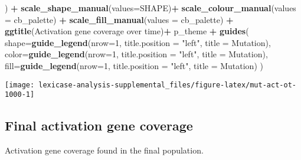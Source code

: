 \documentclass[
]{book}
\newenvironment{Shaded}{\begin{snugshade}}{\end{snugshade}}
\newcommand{\AttributeTok}[1]{\textcolor[rgb]{0.13,0.29,0.53}{#1}}
\newcommand{\DecValTok}[1]{\textcolor[rgb]{0.00,0.00,0.81}{#1}}
\newcommand{\FunctionTok}[1]{\textcolor[rgb]{0.13,0.29,0.53}{\textbf{#1}}}
\newcommand{\NormalTok}[1]{#1}
\newcommand{\SpecialCharTok}[1]{\textcolor[rgb]{0.81,0.36,0.00}{\textbf{#1}}}
\newcommand{\StringTok}[1]{\textcolor[rgb]{0.31,0.60,0.02}{#1}}
\begin{document}
\begin{Shaded}
\begin{Highlighting}[]
\NormalTok{  ) }\SpecialCharTok{+}
  \FunctionTok{scale\_shape\_manual}\NormalTok{(}\AttributeTok{values=}\NormalTok{SHAPE)}\SpecialCharTok{+}
  \FunctionTok{scale\_colour\_manual}\NormalTok{(}\AttributeTok{values =}\NormalTok{ cb\_palette) }\SpecialCharTok{+}
  \FunctionTok{scale\_fill\_manual}\NormalTok{(}\AttributeTok{values =}\NormalTok{ cb\_palette) }\SpecialCharTok{+}
  \FunctionTok{ggtitle}\NormalTok{(}\StringTok{\textquotesingle{}Activation gene coverage over time\textquotesingle{}}\NormalTok{)}\SpecialCharTok{+}
\NormalTok{  p\_theme }\SpecialCharTok{+}
  \FunctionTok{guides}\NormalTok{(}
    \AttributeTok{shape=}\FunctionTok{guide\_legend}\NormalTok{(}\AttributeTok{nrow=}\DecValTok{1}\NormalTok{, }\AttributeTok{title.position =} \StringTok{"left"}\NormalTok{, }\AttributeTok{title =} \StringTok{\textquotesingle{}Mutation\textquotesingle{}}\NormalTok{),}
    \AttributeTok{color=}\FunctionTok{guide\_legend}\NormalTok{(}\AttributeTok{nrow=}\DecValTok{1}\NormalTok{, }\AttributeTok{title.position =} \StringTok{"left"}\NormalTok{, }\AttributeTok{title =} \StringTok{\textquotesingle{}Mutation\textquotesingle{}}\NormalTok{),}
    \AttributeTok{fill=}\FunctionTok{guide\_legend}\NormalTok{(}\AttributeTok{nrow=}\DecValTok{1}\NormalTok{, }\AttributeTok{title.position =} \StringTok{"left"}\NormalTok{, }\AttributeTok{title =} \StringTok{\textquotesingle{}Mutation\textquotesingle{}}\NormalTok{)}
\NormalTok{  )}
\end{Highlighting}
\end{Shaded}

\texttt{[image: lexicase-analysis-supplemental\_files/figure-latex/mut-act-ot-1000-1]}

\hypertarget{final-activation-gene-coverage-2}{%
\subsection{Final activation gene coverage}\label{final-activation-gene-coverage-2}}

Activation gene coverage found in the final population.
\end{document}

